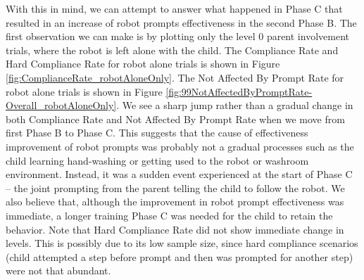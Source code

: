 \documentclass{ut-thesis}
\begin{document}
With this in mind, we can attempt to answer what happened in Phase C that resulted in an increase of robot prompts effectiveness in the second Phase B.  The first observation we can make is by plotting only the level 0 parent involvement trials, where the robot is left alone with the child.  The Compliance Rate and Hard Compliance Rate for robot alone trials is shown in Figure \ref{fig:ComplianceRate_robotAloneOnly}.  The Not Affected By Prompt Rate for robot alone trials is shown in Figure \ref{fig:99NotAffectedByPromptRate-Overall_robotAloneOnly}.  We see a sharp jump rather than a gradual change in both Compliance Rate and Not Affected By Prompt Rate when we move from first Phase B to Phase C.  This suggests that the cause of effectiveness improvement of robot prompts was probably not a gradual processes such as the child learning hand-washing or getting used to the robot or washroom environment.  Instead, it was a sudden event experienced at the start of Phase C -- the joint prompting from the parent telling the child to follow the robot.  We also believe that, although the improvement in robot prompt effectiveness was immediate, a longer training Phase C was needed for the child to retain the behavior.  Note that Hard Compliance Rate did not show immediate change in levels.  This is possibly due to its low sample size, since hard compliance scenarios (child attempted a step before prompt and then was prompted for another step) were not that abundant.
\end{document}
